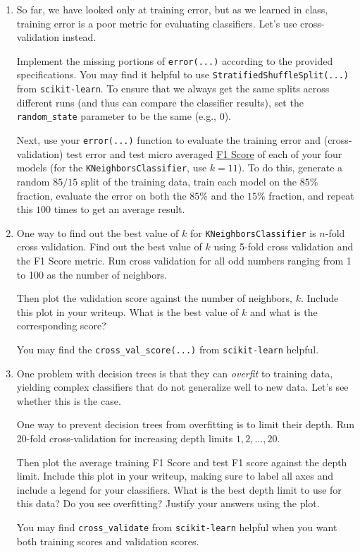 \begin{enumerate}
\item {} So far, we have looked only at training error, but as we learned in class, training error is a poor metric for evaluating classifiers. Let's use cross-validation instead.

Implement the missing portions of \verb|error(...)| according to the provided specifications. You may find it helpful to use \verb|StratifiedShuffleSplit(...)| from \verb|scikit-learn|. To ensure that we always get the same splits across different runs (and thus can compare the classifier results), set the \verb|random_state| parameter to be the same (e.g., 0).


Next, use your \verb|error(...)| function to evaluate the training error and (cross-validation) test error and test micro averaged \href{https://scikit-learn.org/stable/modules/generated/sklearn.metrics.f1_score.html?highlight=f1\%20score#sklearn.metrics.f1_score}{F1 Score} of each of your four models (for the \verb|KNeighborsClassifier|, use $k=11$). To do this, generate a random $85/15$ split of the training data, train each model on the $85\%$ fraction, evaluate the error on both the $85\%$ and the $15\%$ fraction, and repeat this $100$ times to get an average result.


\item {} One way to find out the best value of $k$ for \verb|KNeighborsClassifier| is $n$-fold cross validation.
Find out the best value of $k$ using 5-fold cross validation and the F1 Score metric. Run cross validation for all odd numbers ranging from 1 to 100 as the number of neighbors.

Then plot the validation score against the number of neighbors, $k$. Include this plot in your writeup. What is the best value of $k$ and what is the corresponding score?

You may find the \verb|cross_val_score(...)| from \verb|scikit-learn| helpful. 


\item {} One problem with decision trees is that they can \emph{overfit} to training data, yielding complex classifiers that do not generalize well to new data. Let's see whether this is the case.

One way to prevent decision trees from overfitting is to limit their depth. Run 20-fold cross-validation for increasing depth limits $1,2,\ldots,20$. 

Then plot the average training F1 Score and test F1 score against the depth limit. Include this plot in your writeup, making sure to label all axes and include a legend for your classifiers. What is the best depth limit to use for this data? Do you see overfitting? Justify your answers using the plot.

You may find \verb|cross_validate| from \verb|scikit-learn| helpful when you want both training scores and validation scores.

\end{enumerate}
